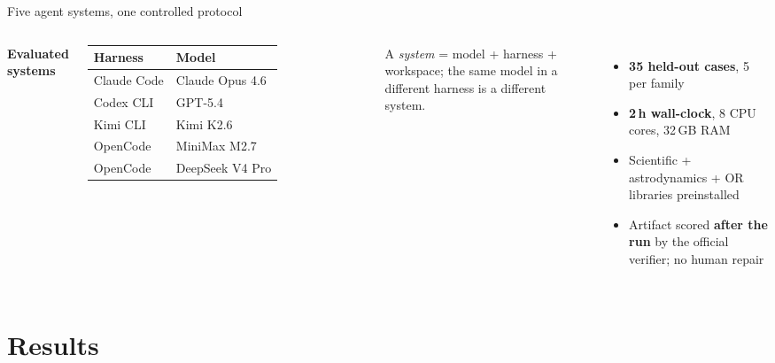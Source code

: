 \documentclass[aspectratio=169,11pt]{beamer}
\newcommand{\cardtitle}[2][abnavy]{{\small\bfseries\color{#1}#2\par}\vspace{0.15em}}
\begin{document}
\begin{frame}{Five agent systems, one controlled protocol}
  \begin{columns}[T]
      \cardtitle{Evaluated systems}
      {\small
      \setlength{\tabcolsep}{4pt}
      \begin{tabularx}{\linewidth}{@{}l l@{}}
        \toprule
        \textbf{Harness} & \textbf{Model} \\
        \midrule
        Claude Code & Claude Opus 4.6 \\
        Codex CLI & GPT-5.4 \\
        Kimi CLI & Kimi K2.6 \\
        OpenCode & MiniMax M2.7 \\
        OpenCode & DeepSeek V4 Pro \\
        \bottomrule
      \end{tabularx}}
      \vspace{0.4em}

      {\scriptsize\color{abgray} A \emph{system} = model + harness + workspace; the same model in a different harness is a different system.}
      \hspace*{0.8em}\cardtitle{Protocol}
      \begin{itemize}\setlength{\itemsep}{0.35em}
        \item \textbf{35 held-out cases}, 5 per family
        \item \textbf{2\,h wall-clock}, 8 CPU cores, 32\,GB RAM
        \item Scientific + astrodynamics + OR libraries preinstalled
        \item Artifact scored \textbf{after the run} by the official verifier; no human repair
      \end{itemize}
  \end{columns}
\end{frame}

\section{Results}
\end{document}
